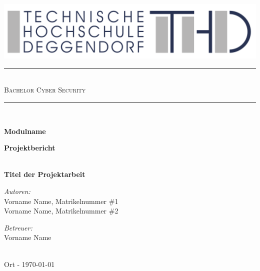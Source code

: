 \documentclass{article}
\begin{document}

\begin{titlepage}
	\begin{center}
		
        \includegraphics[width=\textwidth]{THD-Logo.pdf}
	
	    \vspace{1cm}
	
		\rule{1\textwidth}{1mm} \\[0.3cm]

		\textsc{\scshape \huge Bachelor Cyber Security}\\
		
		\rule{1\textwidth}{1mm} \\[2cm] 
		
		{ %
			 \vspace{1cm}
			 
			 \Large \textbf{Modulname}
			 
			 \vspace{3cm}
			 \Large \textbf{Projektbericht}}\\[0.5cm]
			 \LARGE \textbf{Titel der Projektarbeit}\\[2cm]
		\begin{minipage}[t]{0.4\textwidth}
			\begin{flushleft} \normalsize
				\emph{Autoren:}\\[0.3cm]
				
			    Vorname Name, Matrikelnummer \#1\\
			    Vorname Name, Matrikelnummer \#2\\
				
			\end{flushleft}
		\end{minipage}
		\begin{minipage}[t]{0.5\textwidth}
			\begin{flushright} \normalsize
				\emph{Betreuer:}\\[0.3cm]
				
    			Vorname Name 
				
			\end{flushright}
		\end{minipage}\\[3cm]
		{\large Ort - \today\\}	
		\vspace{3cm}
	\end{center}
\end{titlepage}
\end{document}
